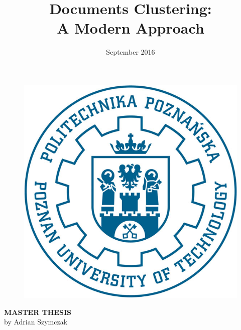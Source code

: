 \documentclass[a4paper, 12pt, oneside]{Thesis} %
\begin{document}

\begin{center}


\begin{figure}
\centering
\includegraphics{Figures/logo.jpg}
\end{figure}

\vspace*{20mm}

\Huge
\textbf{MASTER THESIS} \\
\Large
by Adrian Szymczak\\

\end{center}

\title {Documents Clustering:\\ A Modern Approach}
\addresses {\groupname\\\deptname\\\univname} %
\date {September 2016}
\subject {}
\keywords {}

\maketitle
\end{document}
